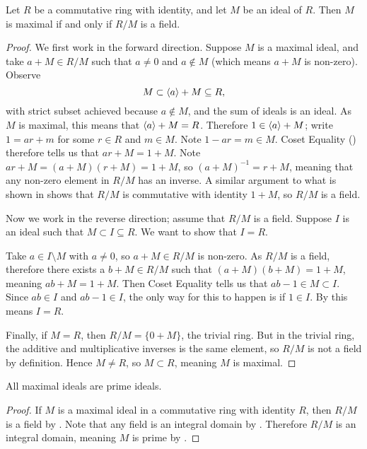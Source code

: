 \begin{theorem}\label{thrm-maximal-ideal-iff-quotient-ring-is-field}
    Let $R$ be a commutative ring with identity, and let $M$ be an ideal of $R$. Then $M$ is maximal if and only if $R/M$ is a field.
\end{theorem}
\begin{proof}
    We first work in the forward direction. Suppose $M$ is a maximal ideal, and take $a + M \in R/M$ such that $a \neq 0$ and $a \notin M$ (which means $a + M$ is non-zero). Observe
    \[
        M \subset \left\langle a\right\rangle + M \subseteq R,
    \]
    with strict subset achieved because $a \notin M$, and the sum of ideals is an ideal. As $M$ is maximal, this means that $\left\langle a\right\rangle + M = R$. Therefore $1 \in \left\langle a\right\rangle + M$; write $1 = ar + m$ for some $r \in R$ and $m \in M$. Note $1-ar = m \in M$. Coset Equality () therefore tells us that $ar + M = 1 + M$. Note $ar + M = (a+M)(r+M) = 1 + M$, so $(a+M)^{-1} = r+M$, meaning that any non-zero element in $R/M$ has an inverse. A similar argument to what is shown in  shows that $R/M$ is commutative with identity $1 + M$, so $R/M$ is a field.

    Now we work in the reverse direction; assume that $R/M$ is a field. Suppose $I$ is an ideal such that $M \subset I \subseteq R$. We want to show that $I = R$.

    Take $a \in I \setminus M$ with $a \neq 0$, so $a + M \in R/M$ is non-zero. As $R/M$ is a field, therefore there exists a $b + M \in R/M$ such that $(a+M)(b+M) = 1 + M$, meaning $ab+M = 1+M$. Then Coset Equality tells us that $ab - 1 \in M \subset I$. Since $ab \in I$ and $ab - 1 \in I$, the only way for this to happen is if $1 \in I$. By  this means $I = R$.

    Finally, if $M = R$, then $R/M = \{0 + M\}$, the trivial ring. But in the trivial ring, the additive and multiplicative inverses is the same element, so $R/M$ is not a field by definition. Hence $M \neq R$, so $M \subset R$, meaning $M$ is maximal.
\end{proof}

\begin{theorem}\label{thrm-all-maximal-ideals-are-prime-ideals}
    All maximal ideals are prime ideals.
\end{theorem}
\begin{proof}
    If $M$ is a maximal ideal in a commutative ring with identity $R$, then $R/M$ is a field by . Note that any field is an integral domain by . Therefore $R/M$ is an integral domain, meaning $M$ is prime by .
\end{proof}

